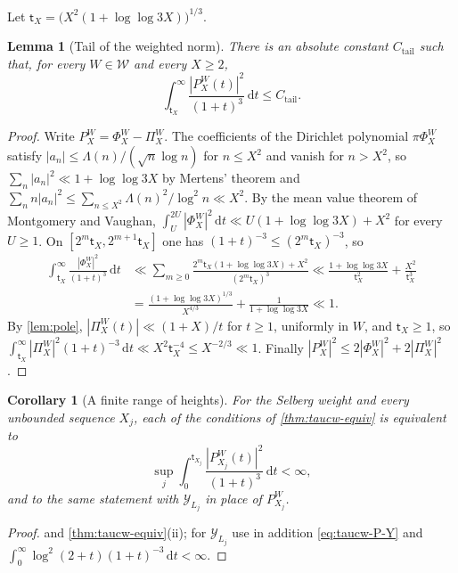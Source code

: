 \documentclass[11pt,a4paper]{article}
\numberwithin{equation}{section}
\newtheorem{lemma}[theorem]{Lemma}
\newtheorem{corollary}[theorem]{Corollary}
\theoremstyle{definition}
\theoremstyle{remark}
\newcommand{\dd}{\,\mathrm dt}
\begin{document}
Let $\mathsf t_X=\bigl(X^2(1+\log\log3X)\bigr)^{1/3}$.

\begin{lemma}[Tail of the weighted norm]\label{lem:taucw-tail}
There is an absolute constant $C_{\mathrm{tail}}$ such that, for every $W\in\mathcal W$ and every $X\ge2$,
\begin{equation}\label{eq:taucw-tail}
\int_{\mathsf t_X}^\infty\frac{|P^W_X(t)|^2}{(1+t)^3}\dd\le C_{\mathrm{tail}} .
\end{equation}
\end{lemma}
\begin{proof}
Write $P^W_X=\Phi^W_X-\Pi^W_X$. The coefficients of the Dirichlet polynomial $\pi\Phi^W_X$ satisfy $|a_n|\le\Lambda(n)/(\sqrt n\log n)$ for $n\le X^2$ and vanish for $n>X^2$, so $\sum_n|a_n|^2\ll1+\log\log3X$ by Mertens' theorem and $\sum_nn|a_n|^2\le\sum_{n\le X^2}\Lambda(n)^2/\log^2n\ll X^2$. By the mean value theorem of Montgomery and Vaughan, $\int_U^{2U}|\Phi^W_X|^2\dd\ll U(1+\log\log3X)+X^2$ for every $U\ge1$. On $[2^m\mathsf t_X,2^{m+1}\mathsf t_X]$ one has $(1+t)^{-3}\le(2^m\mathsf t_X)^{-3}$, so
\begin{equation}
\begin{aligned}
\int_{\mathsf t_X}^\infty\frac{|\Phi^W_X|^2}{(1+t)^3}\dd&\ll\sum_{m\ge0}\frac{2^m\mathsf t_X(1+\log\log3X)+X^2}{(2^m\mathsf t_X)^3}\ll\frac{1+\log\log3X}{\mathsf t_X^2}+\frac{X^2}{\mathsf t_X^3}\\
&=\frac{(1+\log\log3X)^{1/3}}{X^{4/3}}+\frac1{1+\log\log3X}\ll1 .
\end{aligned}
\end{equation}
By \cref{lem:pole}, $|\Pi^W_X(t)|\ll(1+X)/t$ for $t\ge1$, uniformly in $W$, and $\mathsf t_X\ge1$, so $\int_{\mathsf t_X}^\infty|\Pi^W_X|^2(1+t)^{-3}\dd\ll X^2\mathsf t_X^{-4}\le X^{-2/3}\ll1$. Finally $|P^W_X|^2\le2|\Phi^W_X|^2+2|\Pi^W_X|^2$.
\end{proof}

\begin{corollary}[A finite range of heights]\label{cor:taucw-trunc}
For the Selberg weight and every unbounded sequence $X_j$, each of the conditions of \cref{thm:taucw-equiv} is equivalent to
\begin{equation}\label{eq:taucw-trunc}
\sup_j\int_0^{\mathsf t_{X_j}}\frac{|P^W_{X_j}(t)|^2}{(1+t)^3}\dd<\infty,
\end{equation}
and to the same statement with $\mathcal Y_{L_j}$ in place of $P^W_{X_j}$.
\end{corollary}
\begin{proof}
 and \cref{thm:taucw-equiv}(ii); for $\mathcal Y_{L_j}$ use in addition \eqref{eq:taucw-P-Y} and $\int_0^\infty\log^2(2+t)(1+t)^{-3}\dd<\infty$.
\end{proof}
\end{document}
